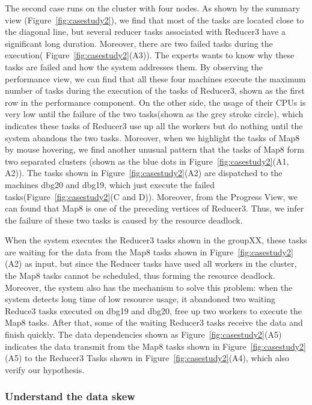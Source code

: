 The second case runs on the cluster with four nodes. As shown by the summary view (Figure~\ref{fig:casestudy2}), we find that most of the tasks are located close to the diagonal line, but several reducer tasks associated with Reducer3 have a significant long duration.
Moreover, there are two failed tasks during the execution( Figure~\ref{fig:casestudy2}(A3)). The experts wants to know why these tasks are failed and how the system addresses them. By observing the performance view, we can find that all these four machines execute the maximum number of tasks during the execution of the tasks of Reducer3, shown as the first row in the performance component. 
On the other side, the usage of their CPUs is very low until the failure of the two tasks(shown as the grey stroke circle), which indicates these tasks of Reducer3 use up all the workers but do nothing until the system abandons the two tasks. Moreover, when we highlight the tasks of Map8 by mouse hovering, we find another unusual pattern that the tasks of Map8 form two separated clusters (shown as the blue dots in Figure~\ref{fig:casestudy2}(A1, A2)).  
The tasks shown in Figure~\ref{fig:casestudy2}(A2) are dispatched to the machines dbg20 and dbg19, which just execute the failed tasks(Figure~\ref{fig:casestudy2}(C and D)). Moreover, from the Progress View, we can found that Map8 is one of the preceding vertices of Reducer3. Thus, we infer the failure of these two tasks is caused by the resource deadlock. 

When the system executes the Reducer3 tasks shown in the groupXX, these tasks are waiting for the data from the Map8 tasks shown in Figure~\ref{fig:casestudy2}(A2) as input, but since the Reducer tasks have used all workers in the cluster, the Map8 tasks cannot be scheduled, thus forming the resource deadlock. 
Moreover, the system also has the mechanism to solve this problem: when the system detects long time  of low resource usage, it abandoned two waiting Reduce3 tasks executed on dbg19 and dbg20, free up two workers to execute the Map8 tasks. After that, some of the waiting Reducer3 tasks receive the data and finish quickly. The data dependencies shown as Figure~\ref{fig:casestudy2}(A5) indicates the data transmit from the Map8 tasks shown in Figure~\ref{fig:casestudy2}(A5) to the Reducer3 Tasks shown in Figure~\ref{fig:casestudy2}(A4), which also verify our hypothesis.

\subsubsection{Understand the data skew}

